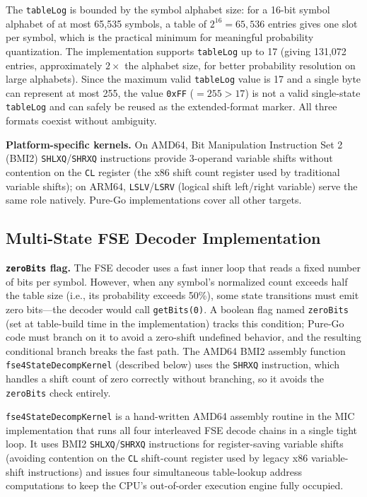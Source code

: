 \documentclass[journal]{IEEEtran}
\begin{document}
The \texttt{tableLog} is bounded by the symbol alphabet size: for a 16-bit
symbol alphabet of at most 65,535 symbols, a table of $2^{16} = 65{,}536$
entries gives one slot per symbol, which is the practical minimum for
meaningful probability quantization. The implementation supports
\texttt{tableLog} up to 17 (giving 131,072 entries, approximately $2\times$
the alphabet size, for better probability resolution on large alphabets).
Since the maximum valid \texttt{tableLog} value is 17 and a single byte can
represent at most 255, the value \texttt{0xFF} ($= 255 > 17$) is not a valid
single-state \texttt{tableLog} and can safely be reused as the
extended-format marker. All three formats coexist without ambiguity.

\textbf{Platform-specific kernels.} On AMD64, Bit Manipulation Instruction
Set 2 (BMI2) \texttt{SHLXQ}/\texttt{SHRXQ} instructions provide 3-operand
variable shifts without contention on the \texttt{CL} register (the x86 shift
count register used by traditional variable shifts); on ARM64,
\texttt{LSLV}/\texttt{LSRV} (logical shift left/right variable) serve the same
role natively. Pure-Go implementations cover all other targets.

\subsection{Multi-State FSE Decoder Implementation}

\textbf{\texttt{zeroBits} flag.} The FSE decoder uses a fast inner loop that
reads a fixed number of bits per symbol. However, when any symbol's
normalized count exceeds half the table size (i.e., its probability exceeds
50\%), some state transitions must emit zero bits---the decoder would call
\texttt{getBits(0)}. A boolean flag named \texttt{zeroBits} (set at
table-build time in the implementation) tracks this condition; Pure-Go code
must branch on it to avoid a zero-shift undefined behavior, and the resulting
conditional branch breaks the fast path. The AMD64 BMI2 assembly function
\texttt{fse4StateDecompKernel} (described below) uses the \texttt{SHRXQ}
instruction, which handles a shift count of zero correctly without branching,
so it avoids the \texttt{zeroBits} check entirely.

\texttt{fse4StateDecompKernel} is a hand-written AMD64 assembly routine in
the MIC implementation that runs all four interleaved FSE decode chains in a
single tight loop. It uses BMI2 \texttt{SHLXQ}/\texttt{SHRXQ} instructions
for register-saving variable shifts (avoiding contention on the \texttt{CL}
shift-count register used by legacy x86 variable-shift instructions) and
issues four simultaneous table-lookup address computations to keep the CPU's
out-of-order execution engine fully occupied.
\end{document}
